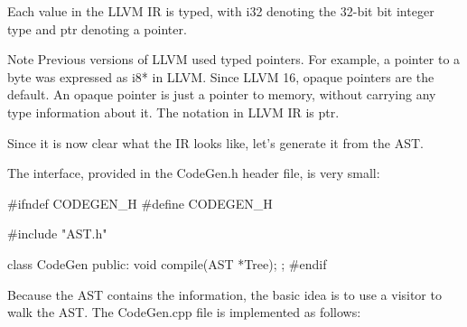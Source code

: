 Each value in the LLVM IR is typed, with i32 denoting the 32-bit bit integer type and ptr denoting a pointer.

\begin{myNotic}{Note}
Previous versions of LLVM used typed pointers. For example, a pointer to a byte was expressed as i8* in LLVM. Since LLVM 16, opaque pointers are the default. An opaque pointer is just a pointer to memory, without carrying any type information about it. The notation in LLVM IR is ptr.
\end{myNotic}

Since it is now clear what the IR looks like, let’s generate it from the AST.


The interface, provided in the CodeGen.h header file, is very small:

\begin{cpp}
#ifndef CODEGEN_H
#define CODEGEN_H

#include "AST.h"

class CodeGen
{
    public:
    void compile(AST *Tree);
};
#endif
\end{cpp}

Because the AST contains the information, the basic idea is to use a visitor to walk the AST. The CodeGen.cpp file is implemented as follows:

